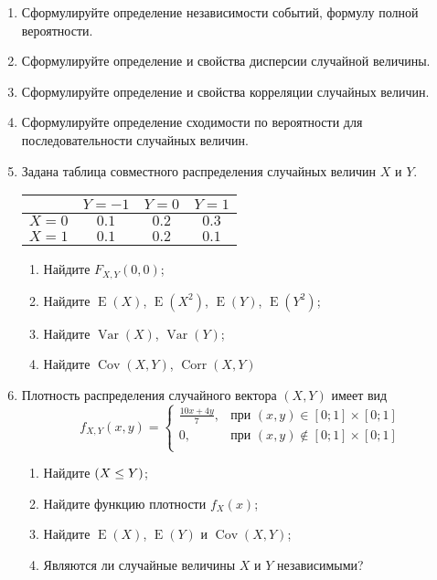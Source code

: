 \documentclass[11pt]{article} %
\DeclareMathOperator{\Cov}{Cov}
\DeclareMathOperator{\Corr}{Corr}
\DeclareMathOperator{\Var}{Var}
\DeclareMathOperator{\E}{E}
\let\P\relax
\DeclareMathOperator{\P}{\mathbb{P}}
\begin{document}
\begin{enumerate}
\item Сформулируйте определение независимости событий, формулу полной вероятности.
\item Сформулируйте определение и свойства дисперсии случайной величины.
\item Сформулируйте определение и свойства корреляции случайных величин.
\item Сформулируйте определение сходимости по вероятности для последовательности случайных величин.
\item Задана таблица совместного распределения случайных величин $X$ и $Y$.
\begin{center}
\begin{tabular}{lccc}
\toprule
                       & $Y=-1$  & $Y=0$   & $Y=1$   \\ 
 \midrule
$X=0$                 & $0.1$ & $0.2$ & $0.3$ \\
 $X=1$                 & $0.1$ & $0.2$ & $0.1$ \\ 
 \bottomrule
\end{tabular}
\end{center}


\begin{enumerate}
    \item Найдите $F_{X,Y}(0, 0)$;
    \item Найдите $\E(X)$, $\E(X^2)$, $\E(Y)$, $\E(Y^2)$;
    \item Найдите $\Var(X)$, $\Var(Y)$;
    \item Найдите $\Cov(X, Y)$, $\Corr(X, Y)$
\end{enumerate}    
\item Плотность распределения случайного вектора $(X,Y)$ имеет вид
\[
f_{X,Y}(x,y) = 
\begin{cases} 
\frac{10x+4y}{7}, & \text{при } (x,y) \in [0;1] \times [0;1] \\ 
0 , & \text{при } (x,y) \not\in [0;1] \times [0;1] \\
\end{cases}
\]

\begin{enumerate}
\item Найдите $\P(X \leq Y)$;
\item Найдите функцию плотности $f_X(x)$;
\item Найдите $\E(X)$, $\E(Y)$ и $\Cov(X, Y)$;
\item Являются ли случайные величины $X$ и $Y$ независимыми?
\end{enumerate} 


\end{enumerate}
\end{document}
